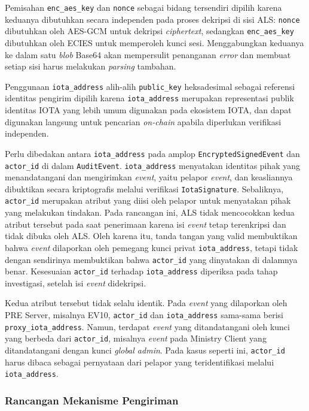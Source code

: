 Pemisahan \texttt{enc\_aes\_key} dan \texttt{nonce} sebagai bidang tersendiri
dipilih karena keduanya dibutuhkan secara independen pada proses dekripsi di sisi
ALS: \texttt{nonce} dibutuhkan oleh AES-GCM untuk dekripsi \textit{ciphertext},
sedangkan \texttt{enc\_aes\_key} dibutuhkan oleh ECIES untuk memperoleh kunci
sesi. Menggabungkan keduanya ke dalam satu \textit{blob} Base64 akan mempersulit
penanganan \textit{error} dan membuat setiap sisi harus melakukan \textit{parsing}
tambahan.

Penggunaan \texttt{iota\_address} alih-alih \texttt{public\_key} heksadesimal
sebagai referensi identitas pengirim dipilih karena \texttt{iota\_address}
merupakan representasi publik identitas IOTA yang lebih umum digunakan pada
ekosistem IOTA, dan dapat digunakan langsung untuk pencarian \textit{on-chain}
apabila diperlukan verifikasi independen.

Perlu dibedakan antara \texttt{iota\_address} pada amplop
\texttt{EncryptedSignedEvent} dan \texttt{actor\_id} di dalam
\texttt{AuditEvent}. \texttt{iota\_address} menyatakan identitas pihak yang
menandatangani dan mengirimkan \textit{event}, yaitu pelapor \textit{event},
dan keasliannya dibuktikan secara kriptografis melalui verifikasi
\texttt{IotaSignature}. Sebaliknya, \texttt{actor\_id} merupakan atribut yang
diisi oleh pelapor untuk menyatakan pihak yang melakukan tindakan. Pada
rancangan ini, ALS tidak mencocokkan kedua atribut tersebut pada saat
penerimaan karena isi \textit{event} tetap terenkripsi dan tidak dibuka oleh
ALS. Oleh karena itu, tanda tangan yang valid membuktikan bahwa \textit{event}
dilaporkan oleh pemegang kunci privat \texttt{iota\_address}, tetapi tidak
dengan sendirinya membuktikan bahwa \texttt{actor\_id} yang dinyatakan di
dalamnya benar. Kesesuaian \texttt{actor\_id} terhadap \texttt{iota\_address}
diperiksa pada tahap investigasi, setelah isi \textit{event} didekripsi.

Kedua atribut tersebut tidak selalu identik. Pada \textit{event} yang dilaporkan
oleh PRE Server, misalnya EV10, \texttt{actor\_id} dan \texttt{iota\_address}
sama-sama berisi \texttt{proxy\_iota\_address}. Namun, terdapat \textit{event}
yang ditandatangani oleh kunci yang berbeda dari \texttt{actor\_id}, misalnya
\textit{event} pada Ministry Client yang ditandatangani dengan kunci
\textit{global admin}. Pada kasus seperti ini, \texttt{actor\_id} harus dibaca
sebagai pernyataan dari pelapor yang teridentifikasi melalui
\texttt{iota\_address}.

\subsubsection{Rancangan Mekanisme Pengiriman}
\label{subsubsec:rancangan-mekanisme-pengiriman}

